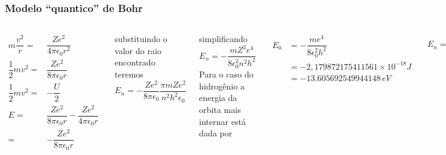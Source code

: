 \documentclass[12pt,brazil]{beamer}
\begin{document}
\begin{frame}
  \frametitle{Modelo ``quantico'' de Bohr}
  \fontsize{9pt}{11pt}\selectfont
        
    \begin{columns}[c]

      \column{5cm}
      \begin{align*}
          m\dfrac{v^2}{r} =& \dfrac{Ze^2}{4\pi \epsilon_0 r^2}\\
          \dfrac{1}{2}mv^2 =& \dfrac{Ze^2}{8\pi \epsilon_0 r}\\
          \dfrac{1}{2}mv^2 =& -\dfrac{U}{2}\\
          E =& \dfrac{Ze^2}{8\pi \epsilon_0 r} -\dfrac{Ze^2}{4\pi \epsilon_0 r}\\
          =& -\dfrac{Ze^2}{8\pi \epsilon_0 r}
      \end{align*}
      
      substituindo o valor do raio encontrado teremos
        \[
          E_n = -\dfrac{Ze^2}{8\pi \epsilon_0}\dfrac{\pi m Z e^2}{n^2 h^2\epsilon_0}
          \nonumber
        \]
      
      \column{5cm}
      
      
        simplificando
        \[
          E_n = -\dfrac{mZ^2e^4}{8 \epsilon_0^2 n^2 h^2}
          \nonumber
        \]
        Para o caso do hidrogênio a energia da orbita mais internar está dada por
        
      \begin{align*}
          E_0 &= -\dfrac{me^4}{8 \epsilon_0^2 h^2}\\
              &= -2,179872175411561\times 10^{-18} J\\
              &= -13.605692549944148\,eV
      \end{align*}
      
      \[
          E_n = E_0\dfrac{Z^2}{n^2}
          \nonumber
        \]
    \end{columns}
\end{frame}
\end{document}
